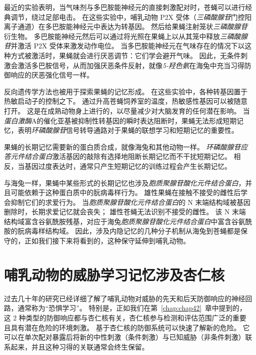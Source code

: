 最近的实验表明，当气味剂与多巴胺能神经元的直接刺激配对时，苍蝇可以进行经典调节，绕过足部电击。
在这些实验中，哺乳动物 P2X 受体（\textit{三磷酸腺苷}门控阳离子通道）在多巴胺能神经元中表达为转基因。
然后给果蝇注射笼状\textit{三磷酸腺苷}衍生物。
多巴胺能神经元然后可以通过将光照在果蝇上以从其笼中释放\textit{三磷酸腺苷}并激活 P2X 受体来激发动作电位。
当多巴胺能神经元在气味存在的情况下以这种方式被激活时，果蝇就会进行厌恶调节：它们学会避开气味。
因此，无条件刺激会激活多巴胺信号，从而加强厌恶条件反射，就像\textit{5-羟色氨}在海兔中充当习得防御响应的厌恶强化信号一样。


反向遗传学方法也被用于探索果蝇的记忆形成。
在这些实验中，各种转基因置于热敏启动子的控制之下。
通过升高苍蝇饲养室的温度，热敏感性基因可以被随意打开。
这是在成熟动物身上进行的，以尽量减少对大脑发育的任何潜在影响。
当\textit{蛋白激酶}A的催化亚基被抑制性转基因的瞬时表达阻断时，果蝇无法形成短期记忆，表明\textit{环磷酸腺苷}信号转导通路对于果蝇的联想学习和短期记忆的重要性。


果蝇的长期记忆需要新的蛋白质合成，就像海兔和其他动物一样。
\textit{环磷酸腺苷应答元件结合蛋白}激活基因的敲除有选择地阻断长期记忆而不干扰短期记忆。
相反，当基因过度表达时，通常只产生短期记忆的训练过程会产生长期记忆。


与海兔一样，果蝇中某些形式的长期记忆也涉及\textit{胞质聚腺苷酸化元件结合蛋白}，并且可能依赖于这种蛋白质中的朊病毒样行为。
雄性果蝇在接触不接受的雌性后学会抑制它们的求爱行为。
当\textit{胞质聚腺苷酸化元件结合蛋白}的 N 末端结构域被基因删除时，长期求爱记忆就会丧失；
雄性苍蝇无法识别不接受的雌性。
该 N 末端结构域富含谷氨酰胺残基，对应于海兔\textit{胞质聚腺苷酸化元件结合蛋白}中富含谷氨酰胺的朊病毒样结构域。
因此，涉及内隐记忆的几种分子机制从海兔到苍蝇都是保守的，正如我们接下来将看到的，这种保守延伸到哺乳动物。



\section{哺乳动物的威胁学习记忆涉及杏仁核}

过去几十年的研究已经详细了解了哺乳动物对威胁的先天和后天防御响应的神经回路，通常称为“恐惧学习”。
特别是，正如我们在第~\ref{chap:chap42}~章中提到的，这 2 种类型的防御响应都与杏仁核有关，杏仁核参与检测和评估范围广泛的重要且具有潜在危险的环境刺激。
基于杏仁核的防御系统可以快速了解新的危险。
它可以在单次配对暴露后将新的中性刺激（条件刺激）与已知威胁（非条件刺激）联系起来，并且这种习得的关联通常会终生保留。


